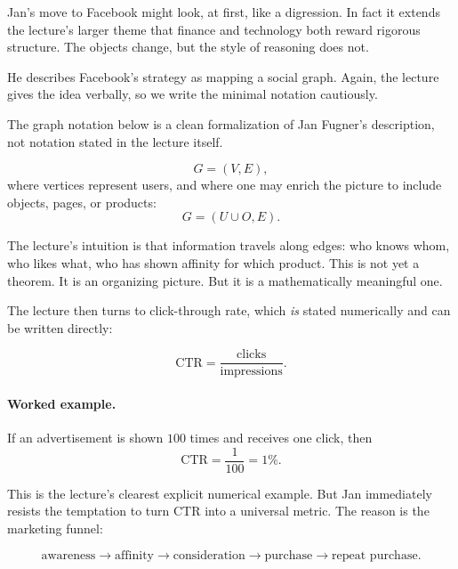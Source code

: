 Jan's move to Facebook might look, at first, like a digression. In fact it extends the lecture's larger theme that finance and technology both reward rigorous structure. The objects change, but the style of reasoning does not.

He describes Facebook's strategy as mapping a social graph. Again, the lecture gives the idea verbally, so we write the minimal notation cautiously.

\begin{remark}
The graph notation below is a clean formalization of Jan Fugner's description, not notation stated in the lecture itself.
\end{remark}

\begin{equation}
G=(V,E),
\end{equation}
where vertices represent users, and where one may enrich the picture to include objects, pages, or products:
\begin{equation}
G=(U\cup O,E).
\end{equation}

The lecture's intuition is that information travels along edges: who knows whom, who likes what, who has shown affinity for which product. This is not yet a theorem. It is an organizing picture. But it is a mathematically meaningful one.

The lecture then turns to click-through rate, which \emph{is} stated numerically and can be written directly:

\begin{equation}
\mathrm{CTR}=\frac{\text{clicks}}{\text{impressions}}.
\end{equation}

\paragraph{Worked example.}
If an advertisement is shown $100$ times and receives one click, then
\begin{equation}
\mathrm{CTR}=\frac{1}{100}=1\%.
\end{equation}

This is the lecture's clearest explicit numerical example. But Jan immediately resists the temptation to turn CTR into a universal metric. The reason is the marketing funnel:

\begin{equation}
\text{awareness}\to\text{affinity}\to\text{consideration}\to\text{purchase}\to\text{repeat purchase}.
\end{equation}

